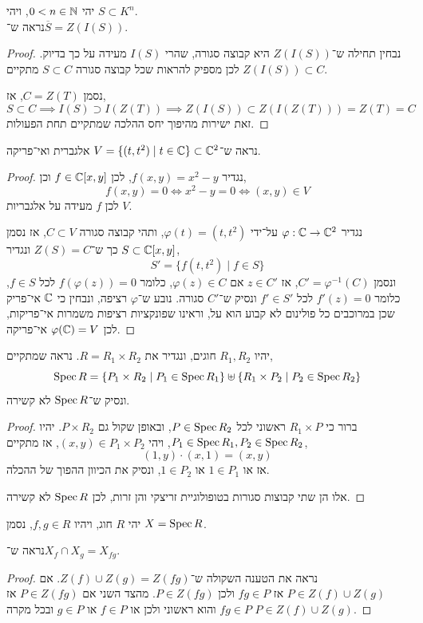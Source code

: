 \subquestion{}
יהי $0 < n \in \mathbb{N}$, ויהי $S \subset K^n$. \\
נראה ש־$\overline{S} = Z(I(S))$.
\begin{proof}
	נבחין תחילה ש־$Z(I(S))$ היא קבוצה סגורה, שהרי $I(S)$ מעידה על כך בדיוק.
	לכן מספיק להראות שכל קבוצה סגורה $S \subset C$ מתקיים $Z(I(S)) \subset C$.

	נסמן $C = Z(T)$, אז,
	\[
		S \subset C
		\implies I(S) \supset I(Z(T))
		\implies Z(I(S)) \subset Z(I(Z(T))) = Z(T) = C
	\]
	זאת ישירות מהיפוך יחס ההלכה שמתקיים תחת הפעולות.
\end{proof}

\question{}
נראה ש־$V = \{ (t, t^2) \mid t \in \mathbb{C} \} \subset \mathbb{C}^2$ אלגברית ואי־פריקה.
\begin{proof}
	נגדיר $f(x, y) = x^2 - y$, לכן $f \in \mathbb{C}[x, y]$ וכן,
	\[
		f(x, y) = 0
		\iff x^2 - y = 0
		\iff (x, y) \in V
	\]
	לכן $f$ מעידה על אלגבריות $V$.

	נגדיר $\varphi : \mathbb{C} \to \mathbb{C}^2$ על־ידי $\varphi(t) = (t, t^2)$, ותהי קבוצה סגורה $C \subset V$, אז נסמן $S \subset \mathbb{C}[x, y]$ כך ש־$Z(S) = C$ ונגדיר,
	\[
		S' = \{ f(t, t^2) \mid f \in S \}
	\]
	ונסמן $C' = \varphi^{-1}(C)$, אז $z \in C'$ אם $\varphi(z) \in C$, כלומר $f(\varphi(z)) = 0$ לכל $f \in S$, כלומר $f'(z) = 0$ לכל $f' \in S'$ ונסיק ש־$C'$ סגורה.
	נובע ש־$\varphi$ רציפה, ונבחין כי $\mathbb{C}$ אי־פריק שכן במרוכבים כל פולינום לא קבוע הוא על, וראינו שפונקציות רציפות משמרות אי־פריקות, לכן $\varphi(\mathbb{C}) = V$ אי־פריקה.
\end{proof}

\question{}
יהיו $R_1, R_2$ חוגים, ונגדיר את $R = R_1 \times R_2$.
נראה שמתקיים,
\[
	\operatorname{Spec} R
	= \{ P_1 \times R_2 \mid P_1 \in \operatorname{Spec} R_1 \} \uplus \{ R_1 \times P_2 \mid P_2 \in \operatorname{Spec} R_2 \}
\]
ונסיק ש־$\operatorname{Spec} R$ לא קשירה.
\begin{proof}
	ברור כי $R_1 \times P$ ראשוני לכל $P \in \operatorname{Spec} R_2$, ובאופן שקול גם $P \times R_2$.
	יהיו $P_1 \in \operatorname{Spec} R_1, P_2 \in \operatorname{Spec} R_2$, ויהי $(x, y) \in P_1 \times P_2$, אז מתקיים,
	\[
		(1, y) \cdot (x, 1)
		= (x, y)
	\]
	אז או $1 \in P_1$ או $1 \in P_2$, ונסיק את הכיוון ההפוך של ההכלה.

	אלו הן שתי קבוצות סגורות בטופולוגיית זריצקי והן זרות, לכן $\operatorname{Spec} R$ לא קשירה.
\end{proof}

\question{}
יהי $R$ חוג, ויהיו $f, g \in R$, נסמן $X = \operatorname{Spec} R$.

\subquestion{}
נראה ש־$X_f \cap X_g = X_{f g}$.
\begin{proof}
	נראה את הטענה השקולה ש־$Z(f) \cup Z(g) = Z(f g)$.
	אם $P \in Z(f) \cup Z(g)$ אז $f g \in P$ ולכן $P \in Z(f g)$.
	מהצד השני אם $P \in Z(f g)$ אז $f g \in P$ והוא ראשוני ולכן או $f \in P$ או $g \in P$ ובכל מקרה $P \in Z(f) \cup Z(g)$.
\end{proof}

